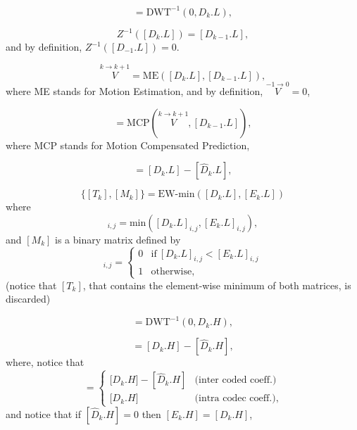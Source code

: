 \begin{equation}
  [D_k.L] = \text{DWT}^{-1}(0, D_k.L),
  \tag{b}
\end{equation}

\begin{equation}
  Z^{-1}([D_k.L]) = [D_{k-1}.L],
  \tag{c}
\end{equation}
and by definition, $Z^{-1}([D_{-1}.L]) = 0$.

\begin{equation}
  \overset{k\rightarrow k+1}{V} = \text{ME}([D_k.L], [D_{k-1}.L]),
  \tag{d}
\end{equation}
where ME stands for Motion Estimation, and by definition,
$\overset{-1\rightarrow 0}{V}=0$,

\begin{equation}
  [\hat{D}_k.L] = \text{MCP}(\overset{k\rightarrow k+1}{V}, [D_{k-1}.L]),
  \tag{e}
\end{equation}
where MCP stands for Motion Compensated Prediction,

\begin{equation}
  [E_k.L] = [D_k.L] - [\hat{D}_k.L],
  \tag{f}
\end{equation}

\begin{equation}
  \{[T_k],[M_k]\} = \text{EW-min}([D_k.L], [E_k.L])
  \tag{g}
\end{equation}
where
\begin{equation}
  [T_k]_{i,j}=\text{min}([D_k.L]_{i,j}, [E_k.L]_{i,j}),
\end{equation}
and $[M_k]$ is a binary matrix defined by
\begin{equation}
  [M_k]_{i,j} = \left\{
  \begin{array}{ll}
    0 & \text{if}~[D_k.L]_{i,j} < [E_k.L]_{i,j} \\
    1 & \text{otherwise},
  \end{array}
  \right.
  \label{eq:matrix}
\end{equation}
(notice that $[T_k]$, that contains the element-wise minimum of both
matrices, is discarded)

\begin{equation}
  [D_k.H] = \text{DWT}^{-1}(0, D_k.H),
  \tag{h}
\end{equation}

\begin{equation}
  [E_k.H] = [D_k.H] - [\hat{D}_k.H],
  \tag{i}
\end{equation}
where, notice that
\begin{equation}
  [E_k.H] = \left\{
  \begin{array}{ll}
    {[}D_k.H{]} - [\hat{D}_k.H] & \text{(inter coded coeff.)} \\
    {[}D_k.H{]}                 & \text{(intra codec coeff.)},
  \end{array}
  \right.
\end{equation}
and notice that if $[\hat{D}_k.H]=0$ then $[E_k.H] = [D_k.H]$,

